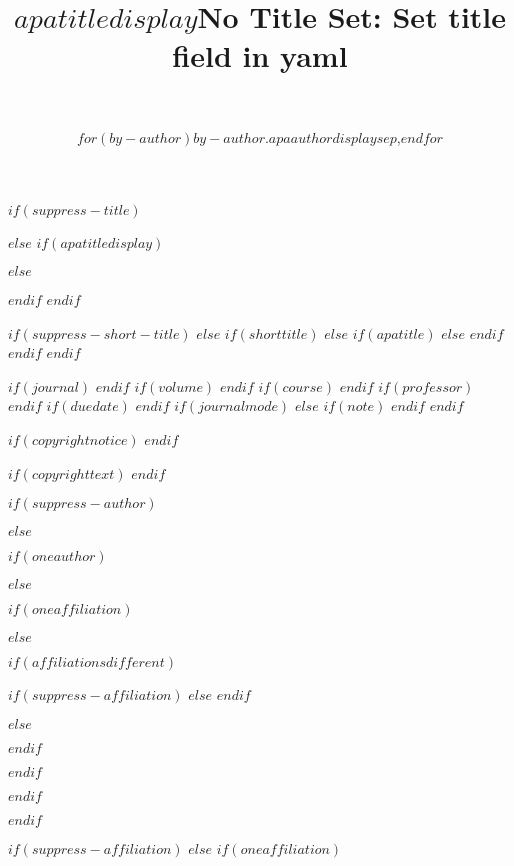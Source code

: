 $if(suppress-title)$
\title{}
$else$
$if(apatitledisplay)$
\title{$apatitledisplay$}
$else$
\title{No Title Set: Set title field in yaml}
$endif$
$endif$


$if(suppress-short-title)$
\shorttitle{}
$else$
$if(shorttitle)$
$else$
$if(apatitle)$
$else$
$endif$
$endif$
$endif$


\usepackage{etoolbox}


$if(journal)$
$endif$
$if(volume)$
$endif$
$if(course)$
$endif$
$if(professor)$
$endif$
$if(duedate)$
$endif$
$if(journalmode)$
$else$
$if(note)$
$endif$
$endif$

$if(copyrightnotice)$
$endif$

$if(copyrighttext)$
$endif$

$if(suppress-author)$
\author{~}
$else$

$if(oneauthor)$
\author{$for(by-author)$$by-author.apaauthordisplay$$sep$,$endfor$}
$else$

$if(oneaffiliation)$


$else$

$if(affiliationsdifferent)$

$if(suppress-affiliation)$
$else$
$endif$


$else$


$endif$

$endif$

$endif$

$endif$

$if(suppress-affiliation)$
\affiliation{}
$else$
$if(oneaffiliation)$



